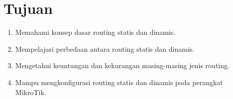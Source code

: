 \section*{Tujuan}

\begin {enumerate}
    \item Memahami konsep dasar routing statis dan dinamis.
    \item Mempelajari perbedaan antara routing statis dan dinamis.
    \item Mengetahui keuntungan dan kekurangan masing-masing jenis routing.
    \item Mampu mengkonfigurasi routing statis dan dinamis pada perangkat MikroTik.
\end {enumerate}